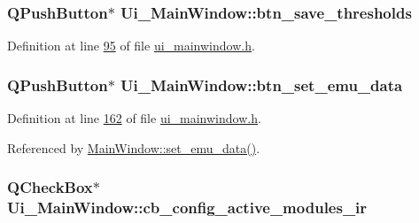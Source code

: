 \hypertarget{a00027_ac265ae0ccaa1154deaa634d19415f775}{
\subsubsection[{btn\+\_\+save\+\_\+thresholds}]{\setlength{\rightskip}{0pt plus 5cm}Q\+Push\+Button$\ast$ Ui\+\_\+\+Main\+Window\+::btn\+\_\+save\+\_\+thresholds}}\label{a00027_ac265ae0ccaa1154deaa634d19415f775}


Definition at line \hyperlink{a00052_source_l00095}{95} of file \hyperlink{a00052_source}{ui\+\_\+mainwindow.\+h}.

\hypertarget{a00027_ad05944ce9c8afb0ab60549a326b8e0af}{
\subsubsection[{btn\+\_\+set\+\_\+emu\+\_\+data}]{\setlength{\rightskip}{0pt plus 5cm}Q\+Push\+Button$\ast$ Ui\+\_\+\+Main\+Window\+::btn\+\_\+set\+\_\+emu\+\_\+data}}\label{a00027_ad05944ce9c8afb0ab60549a326b8e0af}


Definition at line \hyperlink{a00052_source_l00162}{162} of file \hyperlink{a00052_source}{ui\+\_\+mainwindow.\+h}.



Referenced by \hyperlink{a00047_source_l00606}{Main\+Window\+::set\+\_\+emu\+\_\+data()}.

\hypertarget{a00027_abef4ef3d5d03026de5d5e172eb0335a6}{
\subsubsection[{cb\+\_\+config\+\_\+active\+\_\+modules\+\_\+ir}]{\setlength{\rightskip}{0pt plus 5cm}Q\+Check\+Box$\ast$ Ui\+\_\+\+Main\+Window\+::cb\+\_\+config\+\_\+active\+\_\+modules\+\_\+ir}}\label{a00027_abef4ef3d5d03026de5d5e172eb0335a6}


